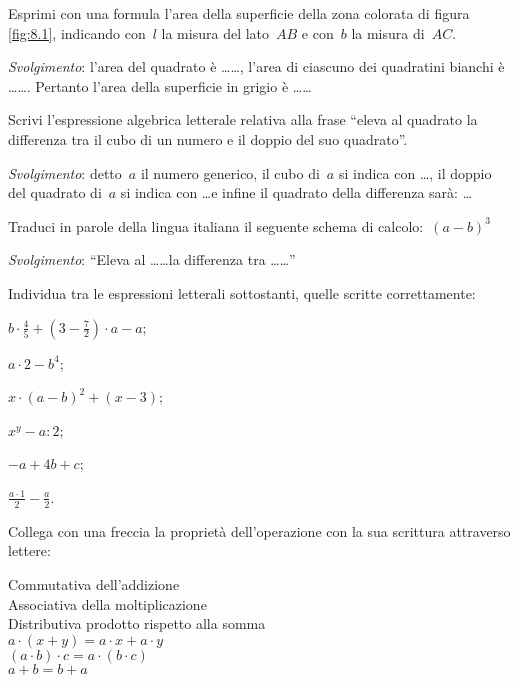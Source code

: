 \begin{multicols}{2}
\begin{esercizio}
\label{ese:8.1}
Esprimi con una formula l'area della superficie della zona colorata di figura \ref{fig:8.1},
indicando con~$l$ la misura del lato~$AB$ e
con~$b$ la misura di~$AC$.

\emph{Svolgimento}: l'area del quadrato è \ldots\ldots,
l'area di ciascuno dei quadratini bianchi è \ldots\ldots. Pertanto l'area della
superficie in
grigio è \ldots\ldots
\end{esercizio}

\begin{esercizio}
\label{ese:8.2}
Scrivi l'espressione algebrica letterale relativa alla frase ``eleva al quadrato la differenza tra il cubo di un
numero e il doppio del suo quadrato''.

\emph{Svolgimento}: detto~$a$ il numero generico, il cubo di~$a$ si indica con \ldots,
il doppio del quadrato di~$a$ si indica con \ldots e infine
il quadrato della differenza sarà: \ldots
\end{esercizio}

\begin{esercizio}
\label{ese:8.3}
Traduci in parole della lingua italiana il seguente schema di calcolo:~$(a-b)^{3}$

\emph{Svolgimento}: ``Eleva al \ldots\ldots la differenza tra \ldots\ldots''
\end{esercizio}

\begin{esercizio}
 \label{ese:8.4}
Individua tra le espressioni letterali sottostanti, quelle scritte correttamente:
\begin{enumeratea}
\spazielenx
 \item $b\cdot {\frac{4}{5}}+\left(3-\frac{7}{2}\right)\cdot a-a$;
 \item $a\cdot 2-b^{4}$;
 \item $x\cdot (a-b)^{2}+(x-3)$;
 \item $x^{y}-a:2$;
 \item $-a+4b+c$;
 \item $\frac{a\cdot 1}{2}-\frac{a}{2}$.
\end{enumeratea}
\end{esercizio}
\end{multicols}

\begin{esercizio}
\label{ese:8.5}
 Collega con una freccia la proprietà dell'operazione con la sua scrittura attraverso lettere:
 \begin{multicols}{2}
 \noindent
 Commutativa dell'addizione\\
 Associativa della moltiplicazione\\
 Distributiva prodotto rispetto alla somma\\
 $a\cdot (x+y)=a\cdot x+a\cdot y$\\
 $\left(a\cdot b\right)\cdot c=a\cdot \left(b\cdot c\right)$\\
 ${a+b=b+a}$
 \end{multicols}
\end{esercizio}

